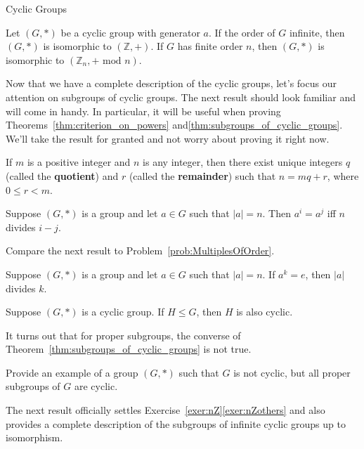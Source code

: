 \begin{section}{Cyclic Groups}
\begin{theorem}
Let $(G,*)$ be a cyclic group with generator $a$. If the order of $G$ infinite, then $(G,*)$ is isomorphic to $(\mathbb{Z},+)$. If $G$ has finite order $n$, then $(G,*)$ is isomorphic to $(\mathbb{Z}_n,+\text{ mod }n)$.
\end{theorem}

Now that we have a complete description of the cyclic groups, let's focus our attention on subgroups of cyclic groups.  The next result should look familiar and will come in handy.  In particular, it will be useful when proving Theorems~\ref{thm:criterion_on_powers} and\ref{thm:subgroups_of_cyclic_groups}.  We'll take the result for granted and not worry about proving it right now.

\begin{theorem}
If $m$ is a positive integer and $n$ is any integer, then there exist unique integers $q$ (called the \textbf{quotient}) and $r$ (called the \textbf{remainder}) such that $n=mq+r$, where $0\leq r<m$.
\end{theorem}

\begin{theorem}\label{thm:criterion_on_powers}
Suppose $(G,*)$ is a group and let $a\in G$ such that $|a|=n$.  Then $a^i=a^j$ iff $n$ divides $i-j$.
\end{theorem}

Compare the next result to Problem~\ref{prob:MultiplesOfOrder}.

\begin{corollary}
Suppose $(G,*)$ is a group and let $a\in G$ such that $|a|=n$.  If $a^k=e$, then $|a|$ divides $k$.
\end{corollary}

\begin{theorem}\label{thm:subgroups_of_cyclic_groups}
Suppose $(G,*)$ is a cyclic group. If $H\leq G$, then $H$ is also cyclic.
\end{theorem}

It turns out that for proper subgroups, the converse of Theorem~\ref{thm:subgroups_of_cyclic_groups} is not true.

\begin{exercise}
Provide an example of a group $(G,*)$ such that $G$ is not cyclic, but all proper subgroups of $G$ are cyclic.
\end{exercise}

The next result officially settles Exercise~\ref{exer:nZ}\ref{exer:nZothers} and also provides a complete description of the subgroups of infinite cyclic groups up to isomorphism.


\end{section}
